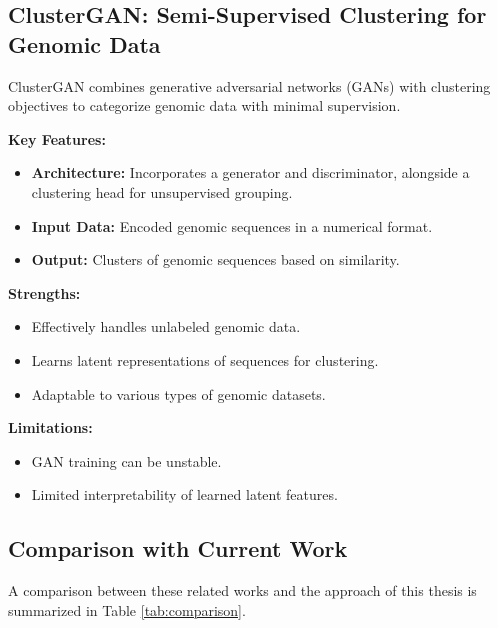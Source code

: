 \subsection{ClusterGAN: Semi-Supervised Clustering for Genomic Data}

ClusterGAN combines generative adversarial networks (GANs) with clustering objectives to categorize genomic data with minimal supervision.

\textbf{Key Features:}
\begin{itemize}
    \item \textbf{Architecture:} Incorporates a generator and discriminator, alongside a clustering head for unsupervised grouping.
    \item \textbf{Input Data:} Encoded genomic sequences in a numerical format.
    \item \textbf{Output:} Clusters of genomic sequences based on similarity.
\end{itemize}

\textbf{Strengths:}
\begin{itemize}
    \item Effectively handles unlabeled genomic data.
    \item Learns latent representations of sequences for clustering.
    \item Adaptable to various types of genomic datasets.
\end{itemize}

\textbf{Limitations:}
\begin{itemize}
    \item GAN training can be unstable.
    \item Limited interpretability of learned latent features.
\end{itemize}

\subsection{Comparison with Current Work}

A comparison between these related works and the approach of this thesis is summarized in Table \ref{tab:comparison}.

